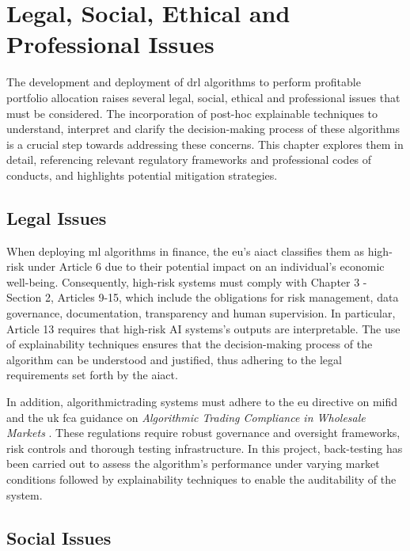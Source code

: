 \chapter{Legal, Social, Ethical and Professional Issues} \label{ch:issues}

The development and deployment of \acrfull{drl} algorithms to perform profitable portfolio allocation raises several legal, social, ethical and professional issues that must be considered. The incorporation of post-hoc explainable techniques to understand, interpret and clarify the decision-making process of these algorithms is a crucial step towards addressing these concerns. This chapter explores them in detail, referencing relevant regulatory frameworks and professional codes of conducts, and highlights potential mitigation strategies.

\section{Legal Issues} \label{sec:legal-issues}

When deploying \acrfull{ml} algorithms in finance, the \acrfull{eu}'s \acrfull{aiact} \cite{AIAct2024} classifies them as high-risk under Article 6 due to their potential impact on an individual's economic well-being. Consequently, high-risk systems must comply with Chapter 3 - Section 2, Articles 9-15, which include the obligations for risk management, data governance, documentation, transparency and human supervision. In particular, Article 13 requires that high-risk AI systems's outputs are interpretable. The use of explainability techniques ensures that the decision-making process of the algorithm can be understood and justified, thus adhering to the legal requirements set forth by the \acrshort{aiact}.

In addition, \gls{algorithmictrading} systems must adhere to the \acrlong{eu} directive on \acrfull{mifid} \cite{MiFIDII} and the \acrfull{uk} \acrfull{fca} guidance on \textit{Algorithmic Trading Compliance in Wholesale Markets} \cite{FCA2018}. These regulations require robust governance and oversight frameworks, risk controls and thorough testing infrastructure. In this project, back-testing has been carried out to assess the algorithm's performance under varying market conditions followed by explainability techniques to enable the auditability of the system.

\section{Social Issues} \label{sec:social-issues}

